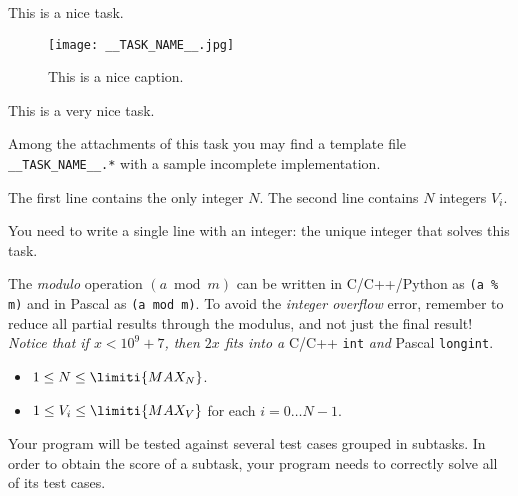 \usepackage{xcolor}
\usepackage{afterpage}
\usepackage{pifont,mdframed}
\usepackage[bottom]{footmisc}

\newcommand{\IIOTsubtask}[3]{\OISubtask{#1}{#2}{#3}}
\newcommand{\limit}[1]{\limiti{#1}}

\makeatletter
\gdef\this@inputfilename{input}
\gdef\this@outputfilename{output}
\makeatother


This is a nice task.

\begin{figure}[H]
    \centering
    \texttt{[image: \_\_TASK\_NAME\_\_.jpg]}
    \caption{This is a nice caption.}
\end{figure}

This is a very nice task.

\begin{warning}
Among the attachments of this task you may find a template file \texttt{__TASK_NAME__.*} with a sample incomplete implementation.
\end{warning}

\InputFile
The first line contains the only integer $N$. The second line contains $N$ integers $V_i$.

\OutputFile
You need to write a single line with an integer: the unique integer that solves this task.


\begin{danger}
The \emph{modulo} operation $(a \bmod m)$ can be written in C/C++/Python as \verb|(a % m)| and in Pascal as \verb|(a mod m)|. To avoid the \emph{integer overflow} error, remember to reduce all partial results through the modulus, and not just the final result! \\
\emph{Notice that if $x < 10^9 + 7$, then $2 x$ fits into a} C/C++ \verb|int| \emph{and} Pascal \verb|longint|.
\end{danger}


\Constraints
\begin{itemize}[nolistsep, itemsep=2mm]
	\item $1 \le N \le \limit{MAX_N}$.
	\item $1 \le V_i \le \limit{MAX_V}$ for each $i=0\ldots N-1$.
\end{itemize}

\Scoring
Your program will be tested against several test cases grouped in subtasks.
In order to obtain the score of a subtask, your program needs to correctly solve all of its test cases.

